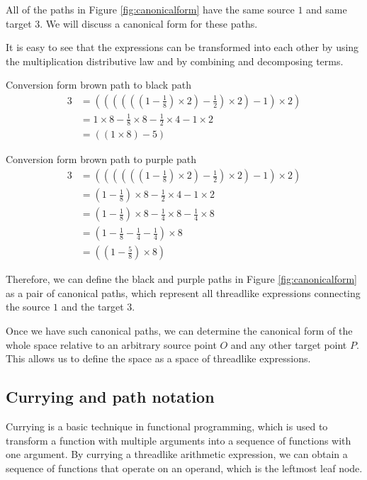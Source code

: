All of the paths in Figure \ref{fig:canonicalform} have the same source $1$ and same target $3$. We will discuss a canonical form for these paths.

It is easy to see that the expressions can be transformed into each other by using the multiplication distributive law and by combining and decomposing terms.

Conversion form brown path to black path
\begin{align}
3 & = ((((((1 - \frac{1}{8}) \times 2) - \frac{1}{2}) \times 2) - 1) \times 2) \\
& = 1 \times 8 -  \frac{1}{8} \times 8 - \frac{1}{2} \times 4 - 1 \times 2 \\
& = ((1 \times 8) - 5)
\end{align}

Conversion form brown path to purple path
\begin{align}
3 & = ((((((1 - \frac{1}{8}) \times 2) - \frac{1}{2}) \times 2) - 1) \times 2) \\
& = (1 - \frac{1}{8}) \times 8 - \frac{1}{2} \times 4 - 1 \times 2 \\
& = (1 - \frac{1}{8}) \times 8 - \frac{1}{4} \times 8 -  \frac{1}{4} \times 8 \\
& = (1 - \frac{1}{8} - \frac{1}{4} - \frac{1}{4}) \times 8 \\
& = ((1 - \frac{5}{8}) \times 8)
\end{align}

Therefore, we can define the black and purple paths in Figure \ref{fig:canonicalform} as a pair of canonical paths,
which represent all threadlike expressions connecting the source $1$ and the target $3$.

Once we have such canonical paths, we can determine the canonical form of the whole space relative to an arbitrary source point $O$
and any other target point $P$. This allows us to define the space as a space of threadlike expressions.

\subsection{Currying and path notation}

Currying is a basic technique in functional programming\cite{Reynolds1972DefinitionalIF}, which is used to transform a function with multiple arguments into a sequence of functions with one argument.
By currying a threadlike arithmetic expression, we can obtain a sequence of functions that operate on an operand, which is the leftmost leaf node.

